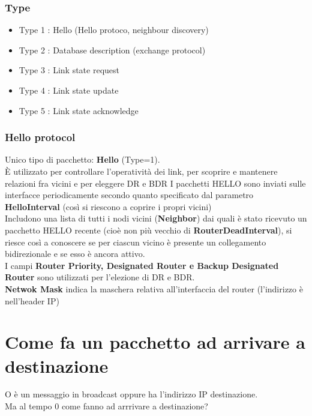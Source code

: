 \documentclass{report}
\begin{document}
            \subsection{Type}
                \begin{itemize}
                    \item Type 1 : Hello (Hello protoco,  neighbour discovery)
                    \item Type 2 : Database description (exchange protocol)
                    \item Type 3 : Link state request
                    \item Type 4 : Link state update 
                    \item Type 5 : Link state acknowledge
                \end{itemize}
            \subsection{Hello protocol}
                Unico tipo di pacchetto: \textbf{Hello} (Type=1).
                \\
                È utilizzato per controllare l'operatività dei link, per scoprire e mantenere relazioni fra vicini e per eleggere DR e BDR 
                I pacchetti HELLO sono inviati sulle interfacce periodicamente secondo quanto specificato dal parametro \textbf{HelloInterval} (così si riescono a coprire i propri vicini)
                \\
                Includono una lista di tutti i nodi vicini (\textbf{Neighbor}) dai quali è stato ricevuto un pacchetto HELLO recente (cioè non più vecchio di \textbf{RouterDeadInterval}), si riesce così a conoscere se per ciascun vicino è presente un
                collegamento bidirezionale e se esso è ancora attivo.
                \\
                I campi \textbf{Router Priority, Designated Router e Backup Designated Router} sono utilizzati per l'elezione di DR e BDR.
                \\
                \textbf{Netwok Mask} indica la maschera relativa all'interfaccia del router (l'indirizzo è nell'header IP)

    \chapter{Come fa un pacchetto ad arrivare a destinazione} {
        O è un messaggio in broadcast oppure ha l'indirizzo IP destinazione.
        \\ 
        Ma al tempo 0 come fanno ad arrrivare a destinazione?
        \\

				
    }
\end{document}
